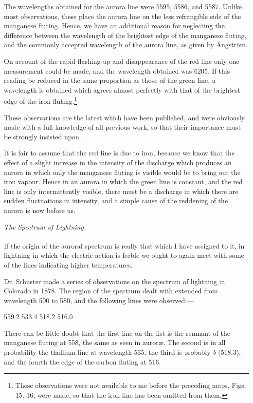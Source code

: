\documentclass[a4paper, 12pt, oneside, polutonikogreek, english]{article}
\begin{document}
The wavelengths obtained for the aurora line were 5595, 5586, and 5587. Unlike most observations, these place the aurora line on the less refrangible side of the manganese fluting. Hence, we have an additional reason for neglecting the difference between the wavelength of the brightest edge of the manganese fluting, and the commonly accepted wavelength of the aurora line, as given by Ångström.

On account of the rapid flashing-up and disappearance of the red line only one measurement could be made, and the wavelength obtained was 6205. If this reading be reduced in the same proportion as those of the green line, a wavelength is obtained which agrees almost perfectly with that of the brightest edge of the iron fluting.\footnote{These observations were not available to me before the preceding maps, Figs. 15, 16, were made, so that the iron line has been omitted from them.}

These observations are the latest which have been published, and were obviously made with a full knowledge of all previous work, so that their importance must be strongly insisted upon.

It is fair to assume that the red line is due to iron, because we know that the effect of a slight increase in the intensity of the discharge which produces an aurora in which only the manganese fluting is visible would be to bring out the iron vapour. Hence in an aurora in which the green line is constant, and the red line is only intermittently visible, there must be a discharge in which there are sudden fluctuations in intensity, and a simple cause of the reddening of the aurora is now before us.
\begin{center}
\emph{The Spectrum of Lightning.}
\end{center}
\paragraph{}
If the origin of the auroral spectrum is really that which I have assigned to it, in lightning in which the electric action is feeble we ought to again meet with some of the lines indicating higher temperatures.

Dr. Schuster made a series of observations on the spectrum of lightning in Colorado in 1878. The region of the spectrum dealt with extended from wavelength 500 to 580, and the following lines were observed:---

559.2 
533.4 
518.2 
516.0 

There can be little doubt that the first line on the list is the remnant of the manganese fluting at 558, the same as seen in auroræ. The second is in all probability the thallium line at wavelength 535, the third is probably \emph{b} (518.3), and the fourth the edge of the carbon fluting at 516.
\end{document}

